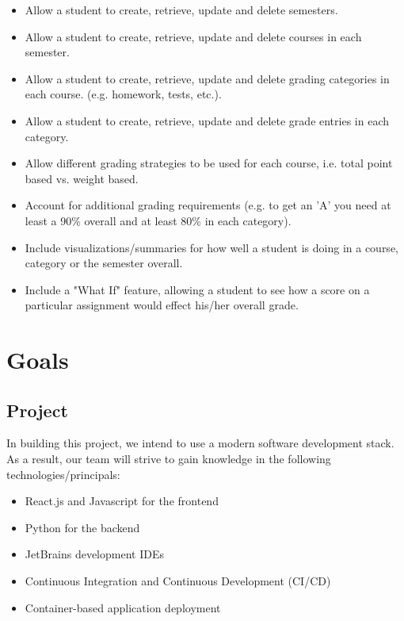 \documentclass[12pt]{article}
\begin{document}
\begin{itemize}
    \item Allow a student to create, retrieve, update and delete semesters.
    \item Allow a student to create, retrieve, update and delete courses in each semester.
    \item Allow a student to create, retrieve, update and delete grading categories in each course.
    (e.g. homework, tests, etc.).
    \item Allow a student to create, retrieve, update and delete grade entries in each category.
    \item Allow different grading strategies to be used for each course, i.e. total point based vs.
    weight based.
    \item Account for additional grading requirements (e.g. to get an 'A' you need at least a 90\%
    overall and at least 80\% in each category).
    \item Include visualizations/summaries for how well a student is doing in a course, category or
    the semester overall.
    \item Include a "What If" feature, allowing a student to see how a score on a particular
    assignment would effect his/her overall grade.
\end{itemize}

\section{Goals}
\subsection{Project}
In building this project, we intend to use a modern software development stack. As a result, our
team will strive to gain knowledge in the following technologies/principals:


\begin{itemize}
    \item React.js and Javascript for the frontend
    \item Python for the backend
    \item JetBrains development IDEs
    \item Continuous Integration and Continuous Development (CI/CD)
    \item Container-based application deployment
\end{itemize}
\end{document}
